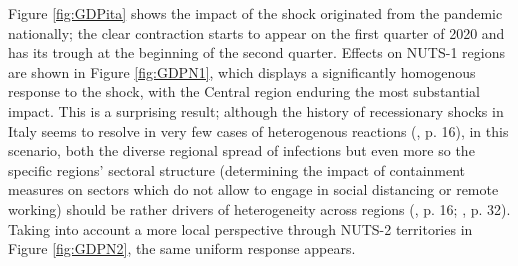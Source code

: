 \documentclass[12pt]{article}
\begin{document}
Figure \ref{fig:GDPita} shows the impact of the shock originated from the pandemic nationally; the clear contraction starts to appear on the first quarter of 2020 and has its trough at the beginning of the second quarter. Effects on NUTS-1 regions are shown in Figure \ref{fig:GDPN1}, which displays a significantly homogenous response to the shock, with the Central region enduring the most substantial impact. This is a surprising result; although the history of recessionary shocks in Italy seems to resolve in very few cases of heterogenous reactions (\cite{cellini_regional_2014}, p. 16), in this scenario, both the diverse regional spread of infections but even more so the specific regions’ sectoral structure (determining the impact of containment measures on sectors which do not allow to engage in social distancing or remote working) should be rather drivers of heterogeneity across regions (\cite{meinen_regional_2021}, p. 16; \cite{ascani_geography_2021}, p. 32). Taking into account a more local perspective through NUTS-2 territories in Figure \ref{fig:GDPN2}, the same uniform response appears.
\end{document}
